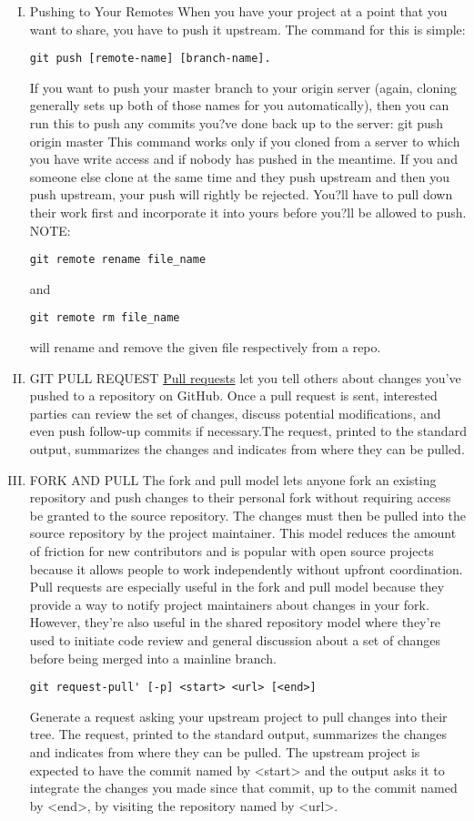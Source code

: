 \documentclass[11pt,utf8]{article}
\begin{document}
\begin{enumerate}[I.]
\item Pushing to Your Remotes
When you have your project at a point that you want to share, you have to push it upstream. The command for this is simple:
\begin{lstlisting}
git push [remote-name] [branch-name].
\end{lstlisting}
If you want to push your master branch to your origin server (again, cloning generally sets up both of those names for you automatically), then you can run this to push any commits you?ve done back up to the server:
git push origin master
This command works only if you cloned from a server to which you have write access and if nobody has pushed in the meantime. If you and someone else clone at the same time and they push upstream and then you push upstream, your push will rightly be rejected. You?ll have to pull down their work first and incorporate it into yours before you?ll be allowed to push.
NOTE: 
\begin{lstlisting}
git remote rename file_name 
\end{lstlisting}
and 
\begin{lstlisting}
git remote rm file_name
\end{lstlisting}
 will rename and remove the given file respectively from a repo.

\item GIT PULL REQUEST
\href{https://www.atlassian.com/git/tutorials/making-a-pull-request/}{Pull requests} let you tell others about changes you've pushed to a repository on GitHub. Once a pull request is sent, interested parties can review the set of changes, discuss potential modifications, and even push follow-up commits if necessary.The request, printed to the standard output, summarizes the changes and indicates from where they can be pulled.

\item FORK AND PULL
The fork and pull model lets anyone fork an existing repository and push changes to their personal fork without requiring access be granted to the source repository. The changes must then be pulled into the source repository by the project maintainer. This model reduces the amount of friction for new contributors and is popular with open source projects because it allows people to work independently without upfront coordination.
Pull requests are especially useful in the fork and pull model because they provide a way to notify project maintainers about changes in your fork. However, they're also useful in the shared repository model where they're used to initiate code review and general discussion about a set of changes before being merged into a mainline branch.
\begin{lstlisting}
git request-pull' [-p] <start> <url> [<end>]
\end{lstlisting}
Generate a request asking your upstream project to pull changes into their tree. The request, printed to the standard output, summarizes the changes and indicates from where they can be pulled. The upstream project is expected to have the commit named by <start> and the output asks it to integrate the changes you made since that commit, up to the commit named by <end>, by visiting the repository named by <url>.


\end{enumerate}
\end{document}
